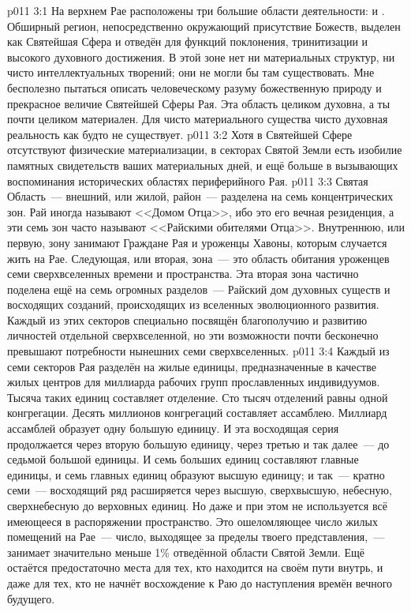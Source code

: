 \vs p011 3:1 На верхнем Рае расположены три большие области деятельности:   и . Обширный регион, непосредственно окружающий присутствие Божеств, выделен как Святейшая Сфера и отведён для функций поклонения, тринитизации и высокого духовного достижения. В этой зоне нет ни материальных структур, ни чисто интеллектуальных творений; они не могли бы там существовать. Мне бесполезно пытаться описать человеческому разуму божественную природу и прекрасное величие Святейшей Сферы Рая. Эта область целиком духовна, а ты почти целиком материален. Для чисто материального существа чисто духовная реальность как будто не существует.
\vs p011 3:2 Хотя в Святейшей Сфере отсутствуют физические материализации, в секторах Святой Земли есть изобилие памятных свидетельств ваших материальных дней, и ещё больше в вызывающих воспоминания исторических областях периферийного Рая.
\vs p011 3:3 Святая Область~--- внешний, или жилой, район~--- разделена на семь концентрических зон. Рай иногда называют <<Домом Отца>>, ибо это его вечная резиденция, а эти семь зон часто называют <<Райскими обителями Отца>>. Внутреннюю, или первую, зону занимают Граждане Рая и уроженцы Хавоны, которым случается жить на Рае. Следующая, или вторая, зона~--- это область обитания уроженцев семи сверхвселенных времени и пространства. Эта вторая зона частично поделена ещё на семь огромных разделов~--- Райский дом духовных существ и восходящих созданий, происходящих из вселенных эволюционного развития. Каждый из этих секторов специально посвящён благополучию и развитию личностей отдельной сверхвселенной, но эти возможности почти бесконечно превышают потребности нынешних семи сверхвселенных.
\vs p011 3:4 Каждый из семи секторов Рая разделён на жилые единицы, предназначенные в качестве жилых центров для миллиарда рабочих групп прославленных индивидуумов. Тысяча таких единиц составляет отделение. Сто тысяч отделений равны одной конгрегации. Десять миллионов конгрегаций составляет ассамблею. Миллиард ассамблей образует одну большую единицу. И эта восходящая серия продолжается через вторую большую единицу, через третью и так далее~--- до седьмой большой единицы. И семь больших единиц составляют главные единицы, и семь главных единиц образуют высшую единицу; и так~--- кратно семи~--- восходящий ряд расширяется через высшую, сверхвысшую, небесную, сверхнебесную до верховных единиц. Но даже и при этом не используется всё имеющееся в распоряжении пространство. Это ошеломляющее число жилых помещений на Рае~--- число, выходящее за пределы твоего представления,~--- занимает значительно меньше 1\% отведённой области Святой Земли. Ещё остаётся предостаточно места для тех, кто находится на своём пути внутрь, и даже для тех, кто не начнёт восхождение к Раю до наступления времён вечного будущего.
